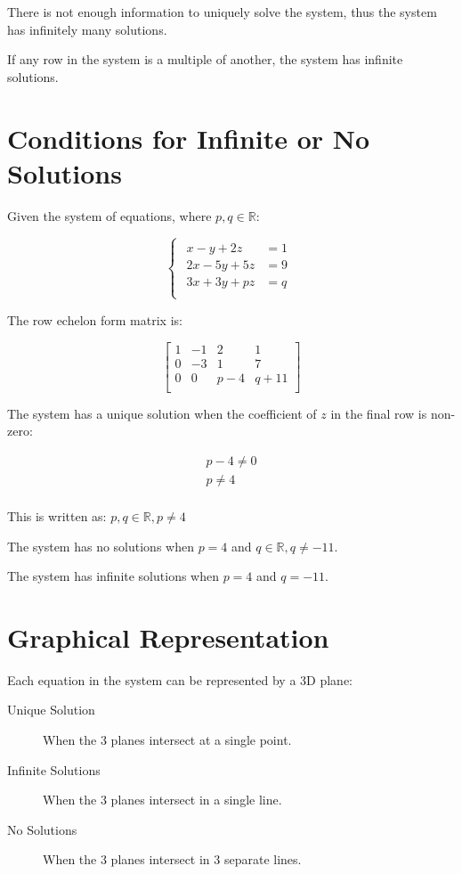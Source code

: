 \documentclass[a4paper,11pt]{report}
\begin{document}
There is not enough information to uniquely solve the system, thus the system
has infinitely many solutions.

If any row in the system is a multiple of another, the system has infinite
solutions.


\section{Conditions for Infinite or No Solutions}

Given the system of equations, where $p, q \in \mathbb{R}$:

$$
\begin{cases}
\begin{aligned}
x - y + 2z & = 1 \\
2x - 5y + 5z & = 9 \\
3x + 3y + pz & = q \\
\end{aligned}
\end{cases}
$$

The row echelon form matrix is:

$$
\begin{bmatrix}
1 & -1 & 2 & 1 \\
0 & -3 & 1 & 7 \\
0 & 0 & p - 4 & q + 11 \\
\end{bmatrix}
$$

The system has a unique solution when the coefficient of $z$ in the final row
is non-zero:

$$
\begin{aligned}
p - 4 \neq 0 \\
p \neq 4 \\
\end{aligned}
$$

This is written as: $p, q \in \mathbb{R}, p \neq 4$

The system has no solutions when $p = 4$ and $q \in \mathbb{R}, q \neq -11$.

The system has infinite solutions when $p = 4$ and $q = -11$.


\section{Graphical Representation}

Each equation in the system can be represented by a 3D plane:

\begin{description}
\item [Unique Solution] When the 3 planes intersect at a single point.
\item [Infinite Solutions] When the 3 planes intersect in a single line.
\item [No Solutions] When the 3 planes intersect in 3 separate lines.
\end{description}
\end{document}
